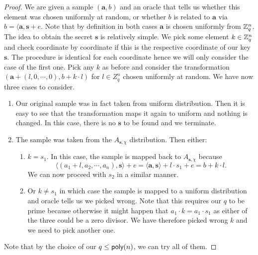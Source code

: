 \begin{proof}
	We are given a sample $(\bm{a}, b)$ and an oracle that tells us whether this element was chosen uniformly at random, or whether $b$ is related to $\bm{a}$ via $b = \langle \bm{a}, \bm{s} + e$. Note that by definition in both cases $\bm{a}$ is chosen uniformly from $\mathbb{Z}_q^n$. The idea to obtain the secret $\bm{s}$ is relatively simple. We pick some element $k \in \mathbb{Z}_q^n$ and check coordinate by coordinate if this is the respective coordinate of our key $\bm{s}$. The procedure is identical for each coordinate hence we will only consider the case of the first one. Pick any $k$ as before and consider the transformation $(\bm{a} + (l, 0, \cdots, 0), b +k \cdot l)$ for $l\in Z_q^n$ chosen uniformly at random. We have now three cases to consider.
	\begin{enumerate}
		\item Our original sample was in fact taken from uniform distribution. Then it is easy to see that the transformation maps it again to uniform and nothing is changed. In this case, there is no $\bm{s}$ to be found and we terminate.
		\item The sample was taken from the $A_{\bm{s}, \chi}$ distribution. Then either:
			\begin{enumerate}
				\item $k = s_1$. In this case, the sample is mapped back to $A_{\bm{s}, \chi}$ because \[ \langle (a_1 + l, a_2, \cdots, a_n), \bm{s} \rangle + e = \langle \bm{a}, \bm{s} \rangle + l \cdot s_1 + e = b + k \cdot l.\] We can now proceed with $s_2$ in a similar manner.
				\item Or $k \neq s_1$ in which case the sample is mapped to a uniform distribution and oracle tells us we picked wrong. Note that this requires our $q$ to be prime because otherwise it might happen that $a_1 \cdot k = a_1 \cdot s_1$ as either of the three could be a zero divisor. We have therefore picked wrong $k$ and we need to pick another one.
			\end{enumerate}
	\end{enumerate}
	Note that by the choice of our $q \leq \alg{poly}(n)$, we can try all of them.
\end{proof}

